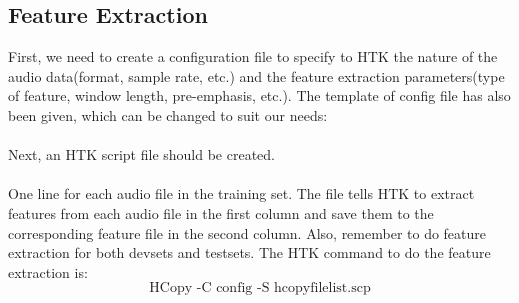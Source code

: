 \documentclass{article}
\begin{document}
\subsection{Feature Extraction}
First, we need to create a configuration file to specify to HTK the nature of the audio data(format, sample rate, etc.) and the feature extraction parameters(type of feature, window length, pre-emphasis, etc.). The template of config file has also been given, which can be changed to suit our needs:\\[2mm]
\\[2mm]
Next, an HTK script file should be created. \\[2mm]
\\[2mm]
One line for each audio file in the training set. The file tells HTK to extract features from each audio file in the first column and save them to the corresponding feature file in the second column. Also, remember to do feature extraction for both devsets and testsets. The HTK command to do the feature extraction is:
$$\text{HCopy -C config -S hcopyfilelist.scp}$$  
\end{document}
